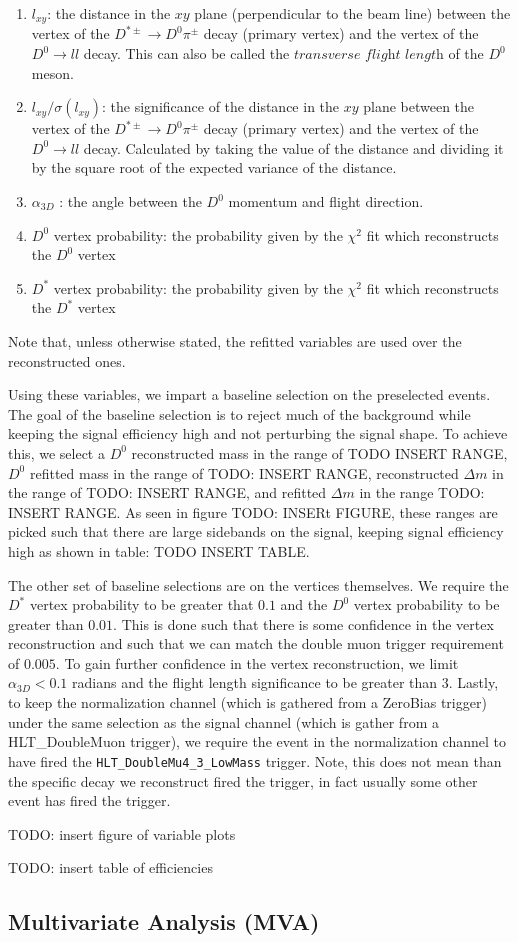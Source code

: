 \begin{enumerate}
    \item $l_{xy}$: the distance in the $xy$ plane (perpendicular to the beam line) between the vertex of the $D^{*\pm} \to D^0 \pi^\pm$ decay (primary vertex) and the vertex of the $D^0 \to l l$ decay.  This can also be called the $\textit{transverse flight length}$ of the $D^0$ meson. 
    \item $l_{xy}/\sigma\left(l_{xy}\right)$: the significance of the distance in the $xy$ plane between the vertex of the $D^{*\pm} \to D^0 \pi^\pm$ decay (primary vertex) and the vertex of the $D^0 \to l l$ decay. Calculated by taking the value of the distance and dividing it by the square root of the expected variance of the distance. 
    \item $\alpha_{3D}$ : the angle between the $D^0$ momentum and flight direction. 
    \item $D^0$ vertex probability: the probability given by the $\chi^2$ fit which reconstructs the $D^0$ vertex 
    \item $D^*$ vertex probability: the probability given by the $\chi^2$ fit which reconstructs the $D^*$ vertex
\end{enumerate}
Note that, unless otherwise stated, the refitted variables are used over the reconstructed ones. 

Using these variables, we impart a baseline selection on the preselected events. The goal of the baseline selection is to reject much of the background while keeping the signal efficiency high and not perturbing the signal shape. To achieve this, we select a $D^0$ reconstructed mass in the range of TODO INSERT RANGE, $D^0$ refitted mass in the range of TODO: INSERT RANGE, reconstructed $\Delta m$ in the range of TODO: INSERT RANGE, and refitted $\Delta m$ in the range TODO: INSERT RANGE. As seen in figure TODO: INSERt FIGURE, these ranges are picked such that there are large sidebands on the signal, keeping signal efficiency high as shown in table: TODO INSERT TABLE.

The other set of baseline selections are on the vertices themselves. We require the $D^*$ vertex probability to be greater that $0.1$ and the $D^0$ vertex probability to be greater than $0.01$. This is done such that there is some confidence in the vertex reconstruction and such that we can match the double muon trigger requirement of $0.005$. To gain further confidence in the vertex reconstruction, we limit $\alpha_{3D} < 0.1$ radians and the flight length significance to be greater than 3. Lastly, to keep the normalization channel (which is gathered from a ZeroBias trigger) under the same selection as the signal channel (which is gather from a HLT\_DoubleMuon trigger), we require the event in the normalization channel to have fired the \texttt{HLT\_DoubleMu4\_3\_LowMass} trigger. Note, this does not mean than the specific decay we reconstruct fired the trigger, in fact usually some other event has fired the trigger. 

TODO: insert figure of variable plots

TODO: insert table of efficiencies






\subsection{Multivariate Analysis (MVA)}



